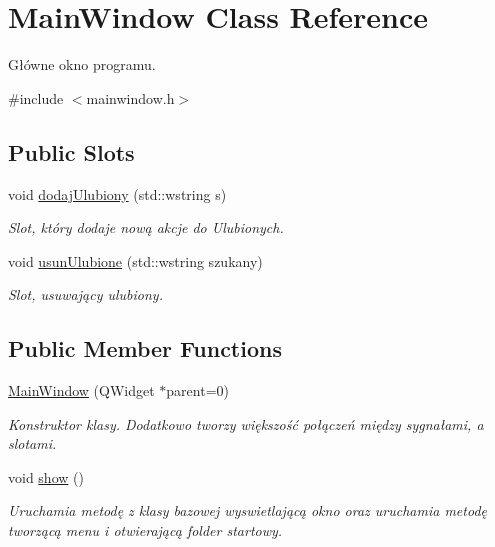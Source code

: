 \hypertarget{class_main_window}{
\section{MainWindow Class Reference}
\label{class_main_window}
}


Główne okno programu.  




{\ttfamily \#include $<$mainwindow.h$>$}

\subsection*{Public Slots}
\begin{DoxyCompactItemize}
\item 
void \hyperlink{class_main_window_a0a78365a1e91551a446e8fa9c8c313dd}{dodajUlubiony} (std::wstring s)
\begin{DoxyCompactList}\small\item\em Slot, który dodaje nową akcje do Ulubionych. \item\end{DoxyCompactList}\item 
void \hyperlink{class_main_window_a190d6b2d07e5acf306eb30f35efc4781}{usunUlubione} (std::wstring szukany)
\begin{DoxyCompactList}\small\item\em Slot, usuwający ulubiony. \item\end{DoxyCompactList}\end{DoxyCompactItemize}
\subsection*{Public Member Functions}
\begin{DoxyCompactItemize}
\item 
\hyperlink{class_main_window_a8b244be8b7b7db1b08de2a2acb9409db}{MainWindow} (QWidget $\ast$parent=0)
\begin{DoxyCompactList}\small\item\em Konstruktor klasy. Dodatkowo tworzy większość połączeń między sygnałami, a slotami. \item\end{DoxyCompactList}\item 
\hypertarget{class_main_window_ae3d7a4598609a86e8bd317c0d85c4495}{
void \hyperlink{class_main_window_ae3d7a4598609a86e8bd317c0d85c4495}{show} ()}
\label{class_main_window_ae3d7a4598609a86e8bd317c0d85c4495}

\begin{DoxyCompactList}\small\item\em Uruchamia metodę z klasy bazowej wyswietlającą okno oraz uruchamia metodę tworzącą menu i otwierającą folder startowy. \item\end{DoxyCompactList}\end{DoxyCompactItemize}


